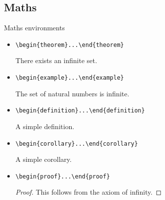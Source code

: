 \documentclass[10pt,aspectratio=169,english]{beamer}
\begin{document}
\begin{frame}
\sectionpage
\end{frame}

\subsection{Maths}

\begin{frame}{Maths environments}
  \begin{itemize}
  \item \lstinline+\begin{theorem}+\lstinline+...\end{theorem}+
    \begin{theorem}
      There exists an infinite set.
    \end{theorem}
  \item \lstinline+\begin{example}...\end{example}+
    \begin{example}
      The set of natural numbers is infinite.
    \end{example}
  \item \lstinline+\begin{definition}+\lstinline+...\end{definition}+\label{sl:definition}
    \begin{definition}
      A simple definition.
    \end{definition}
    \framebreak
  \item \lstinline+\begin{corollary}+\lstinline+...\end{corollary}+
    \begin{corollary}
      A simple corollary.
    \end{corollary}
  \item \lstinline+\begin{proof}...\end{proof}+
    \begin{proof}
      This follows from the axiom of infinity.
    \end{proof}
  \end{itemize}
\end{frame}
\end{document}
